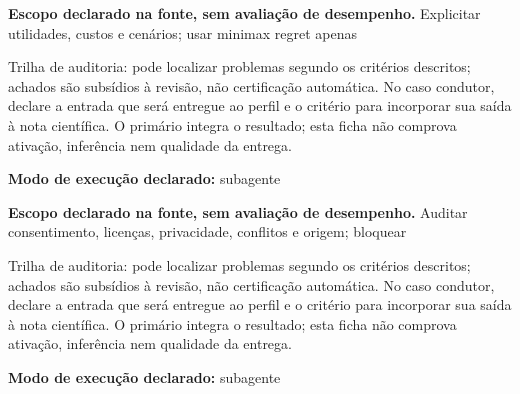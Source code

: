 
\begin{descricao}
\textbf{Escopo declarado na fonte, sem avaliação de desempenho.}
Explicitar utilidades, custos e cenários; usar minimax regret apenas
\end{descricao}

\begin{funcao}
Trilha de auditoria: pode localizar problemas segundo os critérios descritos; achados são subsídios à revisão, não certificação automática. No caso condutor, declare a entrada que será entregue ao perfil e o critério para incorporar sua saída à nota científica. O primário integra o resultado; esta ficha não comprova ativação, inferência nem qualidade da entrega.
\end{funcao}

\begin{arquitetura}
\textbf{Modo de execução declarado:} subagente
\end{arquitetura}


\begin{descricao}
\textbf{Escopo declarado na fonte, sem avaliação de desempenho.}
Auditar consentimento, licenças, privacidade, conflitos e origem; bloquear
\end{descricao}

\begin{funcao}
Trilha de auditoria: pode localizar problemas segundo os critérios descritos; achados são subsídios à revisão, não certificação automática. No caso condutor, declare a entrada que será entregue ao perfil e o critério para incorporar sua saída à nota científica. O primário integra o resultado; esta ficha não comprova ativação, inferência nem qualidade da entrega.
\end{funcao}

\begin{arquitetura}
\textbf{Modo de execução declarado:} subagente
\end{arquitetura}

